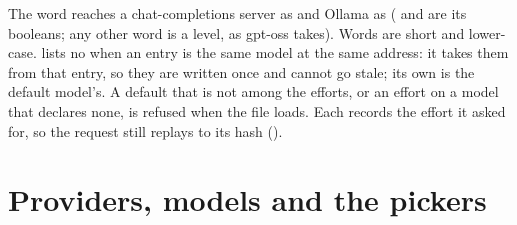 The word reaches a chat-completions server as  and
Ollama as  ( and  are its booleans; any other
word is a level, as gpt-oss takes). Words are short and lower-case.
\code{[control]} lists no  when an entry is the same model at
the same address: it takes them from that entry, so they are written once and
cannot go stale; its own  is the default model's. A default that
is not among the efforts, or an effort on a model that declares none, is
refused when the file loads. Each  records the effort it asked
for, so the request still replays to its hash ().

\section{Providers, models and the pickers}

